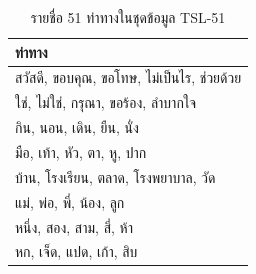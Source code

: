 \documentclass[12pt,a4paper]{report}
\begin{document}
\begin{longtable}{|p{8cm}|}
\caption{รายชื่อ 51 ท่าทางในชุดข้อมูล TSL-51}
\label{tab:signs_list} \\
\hline
\endfirsthead
\hline
\textbf{ท่าทาง} \\
\hline
\endhead
\hline
สวัสดี, ขอบคุณ, ขอโทษ, ไม่เป็นไร, ช่วยด้วย \\
\hline
ใช่, ไม่ใช่, กรุณา, ขอร้อง, ลำบากใจ \\
\hline
กิน, นอน, เดิน, ยืน, นั่ง \\
\hline
มือ, เท้า, หัว, ตา, หู, ปาก \\
\hline
บ้าน, โรงเรียน, ตลาด, โรงพยาบาล, วัด \\
\hline
แม่, พ่อ, พี่, น้อง, ลูก \\
\hline
หนึ่ง, สอง, สาม, สี่, ห้า \\
\hline
หก, เจ็ด, แปด, เก้า, สิบ \\
\hline
\end{longtable}

\clearpage
\end{document}
